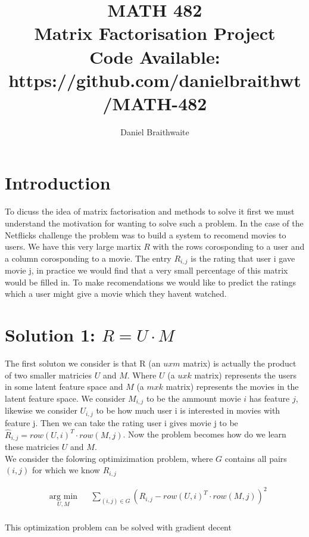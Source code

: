\documentclass{article}
\title{%
	MATH 482\\
	\large Matrix Factorisation Project \\
	\small Code Available: https://github.com/danielbraithwt/MATH-482
}
\author{Daniel Braithwaite}
\begin{document}
\maketitle

\section{Introduction}
To dicuss the idea of matrix factorisation and methods to solve it first we must understand the motivation for wanting to solve such a problem. In the case of the Netflicks challenge the problem was to build a system to recomend movies to users. We have this very large martix $R$ with the rows corosponding to a user and a column corosponding to a movie. The entry $R_{i,j}$ is the rating that user i gave movie j, in practice we would find that a very small percentage of this matrix would be filled in. To make recomendations we would like to predict the ratings which a user might give a movie which they havent watched.\\

\section{Solution 1: $R = U \cdot M$}
The first soluton we consider is that R (an $u x m$ matrix) is actually the product of two smaller matricies $U$ and $M$. Where $U$ (a $u x k$ matrix) represents the users in some latent feature space and $M$ (a $m x k$ matrix) represents the movies in the latent feature space. We consider $M_{i,j}$ to be the ammount movie $i$ has feature $j$, likewise we consider $U_{i,j}$ to be how much user i is interested in movies with feature j. Then we can take the rating user i gives movie j to be $\hat{R}_{i,j} = row(U, i)^T \cdot row(M, j)$. Now the problem becomes how do we learn these matricies $U$ and $M$.\\

We consider the folowing optimizimation problem, where $G$ contains all pairs $(i,j)$ for which we know $R_{i,j}$

\begin{equation*}
\begin{aligned}
& \underset{U, M}{\text{arg min}}
& & \sum_{(i,j) \in G} (R_{i,j} - row(U, i)^T \cdot row(M, j))^2  \\
\end{aligned}
\end{equation*}

This optimization problem can be solved with gradient decent
\end{document}
